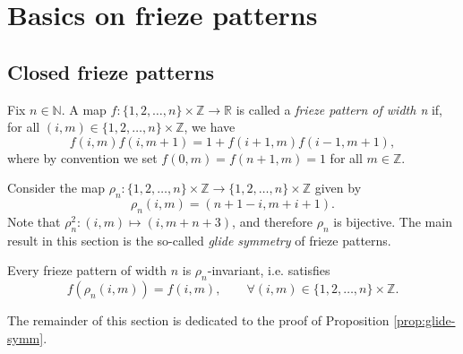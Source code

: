%
\chapter{Basics on frieze patterns}\label{s:fp}
\section{Closed frieze patterns}\label{ss:closed-fp}

\begin{definition}
\label{def:closed-fp}
    Fix $n \in \mathbb{N}$. A map $f : \{1,2,\ldots , n\} \times \mathbb{Z} \longrightarrow \mathbb{R}$ is called
    a \textit{frieze pattern of width n} if, for all $(i,m) \in \{1,2,\ldots , n\} \times \mathbb{Z}$, we have
    \[
        f(i,m) f(i,m+1) = 1 + f(i+1,m) f(i-1, m+1),
    \]
    where by convention we set $f(0,m) = f(n+1,m) = 1$ for all $m \in \mathbb{Z}$. 
\end{definition}

Consider the map $\rho_n: \{1,2,\ldots , n\} \times \mathbb{Z} \longrightarrow \{1,2,\ldots , n\} \times \mathbb{Z}$ given by
\begin{equation}  
\label{def:glide}
    \rho_n(i,m) = (n+1-i, m+i+1).
\end{equation}
Note that $\rho_n^2 : (i,m) \mapsto (i,m+n+3)$, and therefore $\rho_n$ is bijective. The main result in this section is the 
so-called \textit{glide symmetry} of frieze patterns. 

\begin{proposition}
\label{prop:glide-symm}
Every frieze pattern of width $n$ is $\rho_n$-invariant, i.e. satisfies 
\[
    f(\rho_n(i,m)) = f(i,m), \qquad \forall (i,m) \in \{1,2,\ldots , n\} \times \mathbb{Z}.
\]
\end{proposition}
The remainder of this section is dedicated to the proof of Proposition \ref{prop:glide-symm}. 



